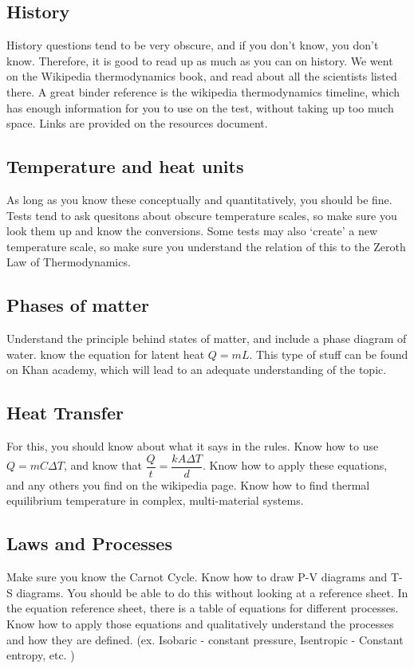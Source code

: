 \documentclass[twocolumn]{article}
\begin{document}
\subsection{History}
History questions tend to be very obscure, and if you don't know, you don't know. Therefore, it is good to read up as much as you can on history. We went on the Wikipedia thermodynamics book, and read about all the scientists listed there. A great binder reference is the wikipedia thermodynamics timeline, which has enough information for you to use on the test, without taking up too much space. Links are provided on the resources document. 

\subsection{Temperature and heat units}
As long as you know these conceptually and quantitatively, you should be fine. Tests tend to ask quesitons about obscure temperature scales, so make sure you look them up and know the conversions. Some tests may also `create' a new temperature scale, so make sure you understand the relation of this to the Zeroth Law of Thermodynamics. 
\subsection{Phases of matter}
Understand the principle behind states of matter, and include a phase diagram of water. know the equation for latent heat $Q=mL$. This type of stuff can be found on Khan academy, which will lead to an adequate understanding of the topic. 
\subsection{Heat Transfer}
For this, you should know about what it says in the rules. Know how to use $Q=mC\Delta T$, and know that $\dfrac{Q}{t}=\dfrac{kA\Delta T}{d}$. Know how to apply these equations, and any others you find on the wikipedia page. Know how to find thermal equilibrium temperature in complex, multi-material systems. 
\subsection{Laws and Processes}
Make sure you know the Carnot Cycle. Know how to draw P-V diagrams and T-S diagrams. You should be able to do this without looking at a reference sheet. In the equation reference sheet, there is a table of equations for different processes. Know how to apply those equations and qualitatively understand the processes and how they are defined. (ex. Isobaric - constant pressure, Isentropic - Constant entropy, etc. )
\end{document}
